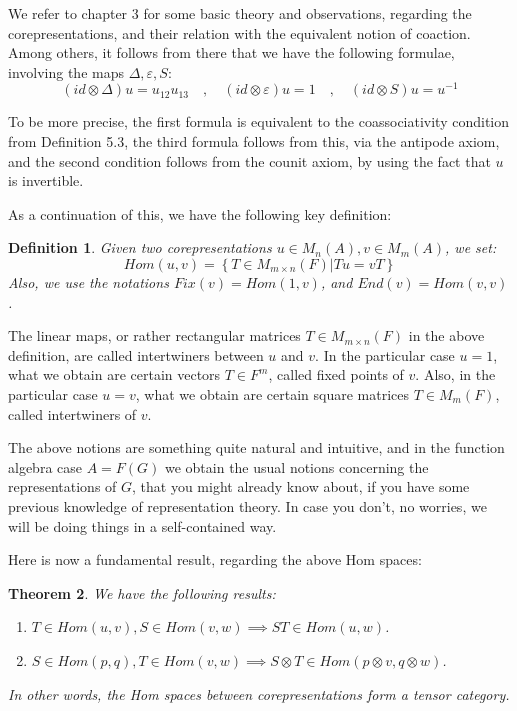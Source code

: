 \documentclass[12pt]{amsbook}
\newtheorem{theorem}{Theorem}[chapter]
\newtheorem{definition}[theorem]{Definition}
\begin{document}
We refer to chapter 3 for some basic theory and observations, regarding the corepresentations, and their relation with the equivalent notion of coaction. Among others, it follows from there that we have the following formulae, involving the maps $\Delta,\varepsilon,S$:
$$(id\otimes\Delta)u=u_{12}u_{13}\quad,\quad (id\otimes \varepsilon)u=1\quad,\quad (id\otimes S)u=u^{-1}$$

To be more precise, the first formula is equivalent to the coassociativity condition from Definition 5.3, the third formula follows from this, via the antipode axiom, and the second condition follows from the counit axiom, by using the fact that $u$ is invertible.

\bigskip

As a continuation of this, we have the following key definition:


\begin{definition}
Given two corepresentations $u\in M_n(A),v\in M_m(A)$, we set: 
$$Hom(u,v)=\left\{T\in M_{m\times n}(F)\Big|Tu=vT\right\}$$
Also, we use the notations $Fix(v)=Hom(1,v)$, and $End(v)=Hom(v,v)$.
\end{definition}

The linear maps, or rather rectangular matrices $T\in M_{m\times n}(F)$ in the above definition, are called intertwiners between $u$ and $v$. In the particular case $u=1$, what we obtain are certain vectors $T\in F^m$, called fixed points of $v$. Also, in the particular case $u=v$, what we obtain are certain square matrices $T\in M_m(F)$, called intertwiners of $v$.

\bigskip

The above notions are something quite natural and intuitive, and in the function algebra case $A=F(G)$ we obtain the usual notions concerning the representations of $G$, that you might already know about, if you have some previous knowledge of representation theory. In case you don't, no worries, we will be doing things in a self-contained way.

\bigskip

Here is now a fundamental result, regarding the above Hom spaces:


\begin{theorem}
We have the following results:
\begin{enumerate}
\item $T\in Hom(u,v),S\in Hom(v,w)\implies ST\in Hom(u,w)$.

\item $S\in Hom(p,q),T\in Hom(v,w)\implies S\otimes T\in Hom(p\otimes v,q\otimes w)$.
\end{enumerate}
In other words, the Hom spaces between corepresentations form a tensor category.
\end{theorem}
\end{document}
